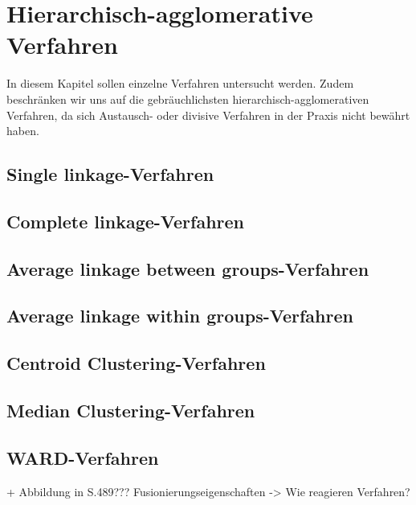 \chapter{Hierarchisch-agglomerative Verfahren}

In diesem Kapitel sollen einzelne Verfahren untersucht werden. Zudem beschränken wir uns auf die gebräuchlichsten hierarchisch-agglomerativen Verfahren, da sich Austausch- oder divisive Verfahren in der Praxis nicht bewährt haben.

\section{Single linkage-Verfahren}
\section{Complete linkage-Verfahren}
\section{Average linkage between groups-Verfahren}
\section{Average linkage within groups-Verfahren}
\section{Centroid Clustering-Verfahren}
\section{Median Clustering-Verfahren}
\section{WARD-Verfahren}

+ Abbildung in \cite{Backhaus.2016} S.489??? Fusionierungseigenschaften -> Wie reagieren Verfahren?